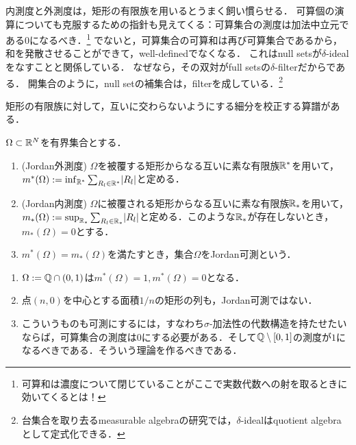 \documentclass[uplatex, dvipdfmx]{jsreport}
\begin{document}
\begin{tcolorbox}[colframe=ForestGreen, colback=ForestGreen!10!white,breakable,colbacktitle=ForestGreen!40!white,coltitle=black,fonttitle=\bfseries\sffamily,
title=有限加法族上の有限加法的測度]
    内測度と外測度は，矩形の有限族を用いるとうまく飼い慣らせる．
    可算個の演算についても克服するための指針も見えてくる：可算集合の測度は加法中立元である$0$になるべき．\footnote{可算和は濃度について閉じていることがここで実数代数への射を取るときに効いてくるとは！}
    でないと，可算集合の可算和は再び可算集合であるから，和を発散させることができて，well-definedでなくなる．
    これはnull setsが$\delta$-idealをなすことと関係している．
    なぜなら，その双対がfull setsの$\delta$-filterだからである．
    開集合のように，null setの補集合は，filterを成している．\footnote{台集合を取り去るmeasurable algebraの研究では，$\delta$-idealはquotient algebraとして定式化できる．}
\end{tcolorbox}

\begin{lemma}
    矩形の有限族に対して，互いに交わらないようにする細分を校正する算譜がある．
\end{lemma}

\begin{definition}
    $\Omega\subset\mathbb{R}^N$を有界集合とする．
    \begin{enumerate}
        \item (Jordan外測度) $\Omega$を被覆する矩形からなる互いに素な有限族$\mathbb{R}^*$を用いて，$m^*(\Omega):=\inf_{\mathbb{R}^*}\sum_{R_l\in\mathbb{R}^*}\lvert R_l\rvert$と定める．
        \item (Jordan内測度) $\Omega$に被覆される矩形からなる互いに素な有限族$\mathbb{R}_*$を用いて，$m_*(\Omega):=\sup_{\mathbb{R}_*}\sum_{R_l\in\mathbb{R}_*}\lvert R_l\rvert$と定める．このような$\mathbb{R}_*$が存在しないとき，$m_*(\Omega)=0$とする．
        \item $m^*(\Omega)=m_*(\Omega)$を満たすとき，集合$\Omega$をJordan可測という．
    \end{enumerate}
\end{definition}

\begin{example}\mbox{}
    \begin{enumerate}
        \item $\Omega:=\mathbb{Q}\cap(0,1)$は$m^*(\Omega)=1,m^*(\Omega)=0$となる．
        \item 点$(n,0)$を中心とする面積$1/n$の矩形の列も，Jordan可測ではない．
        \item こういうものも可測にするには，すなわち$\sigma$-加法性の代数構造を持たせたいならば，可算集合の測度は$0$にする必要がある．そして$\mathbb{Q}\setminus[0,1]$の測度が$1$になるべきである．そういう理論を作るべきである．
    \end{enumerate}
\end{example}
\end{document}
